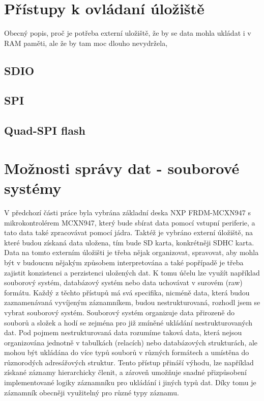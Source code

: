 \section{Přístupy k ovládaní úložiště}
Obecný popis, proč je potřeba externí uložiště, že by se data mohla ukládat i v RAM paměti, ale že by tam moc dlouho nevydržela, 

\subsection{SDIO}

\subsection{SPI}

\subsection{Quad-SPI flash}


\section{Možnosti správy dat - souborové systémy}
V předchozí části práce byla vybrána základní deska NXP FRDM-MCXN947 s mikrokontrolérem MCXN947, který bude sbírat data pomocí vstupní periferie, a tato data také zpracovávat pomocí jádra. Taktéž je vybráno externí úložiště, na které budou získaná data uložena, tím bude SD karta, konkrétněji SDHC karta. Data na tomto externím úložišti je třeba nějak organizovat, spravovat, aby mohla být v budoucnu nějakým způsobem interpretována a také popřípadě je třeba zajistit konzistenci a perzistenci uložených dat. K tomu účelu lze využít například souborový systém, databázový systém nebo data uchovávat v surovém (raw) formátu. Každý z těchto přístupů má svá specifika, nicméně data, která budou zaznamenávaná vyvíjeným záznamníkem, budou nestrukturovaná, rozhodl jsem se vybrat souborový systém. Souborový systém organizuje data přirozeně do souborů a složek a hodí se zejména pro již zmíněné ukládání nestrukturovaných dat. Pod pojmem nestrukturovaná data rozumíme taková data, která nejsou organizována jednotně v tabulkách (relacích) nebo databázových strukturách, ale mohou být ukládána do více typů souborů v různých formátech a umístěna do různorodých adresářových struktur. Tento přístup přináší výhodu, lze například získané záznamy hierarchicky členit, a zároveň umožňuje snadné přizpůsobení implementované logiky záznamníku pro ukládání i jiných typů dat. Díky tomu je záznamník obecněji využitelný pro různé typy záznamu. \cite{weka_structured_unstructured_data, virginia_tech_file_database_systems}

